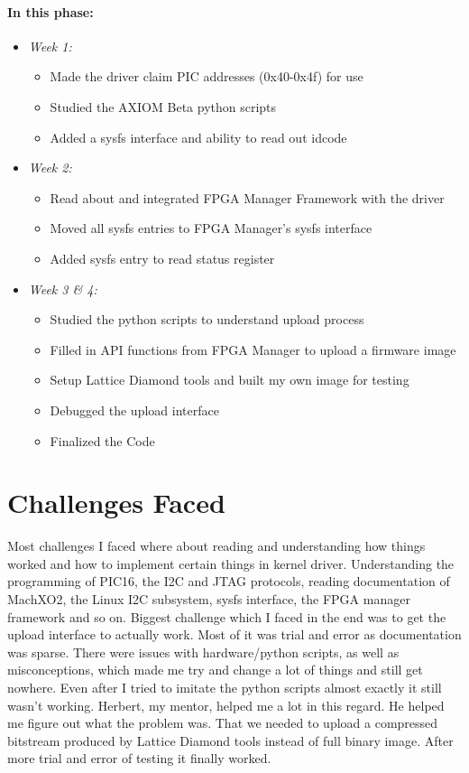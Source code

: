\documentclass{article}
\begin{document}
\paragraph{In this phase:}
\begin{itemize}
\item \emph{Week 1:} 
	\begin{itemize}
	\item Made the driver claim PIC addresses (0x40-0x4f) for use
	\item Studied the AXIOM Beta python scripts
	\item Added a sysfs interface and ability to read out idcode 
	\end{itemize}
\item \emph{Week 2:} 
	\begin{itemize}
	\item Read about and integrated FPGA Manager Framework with the driver 
	\item Moved all sysfs entries to FPGA Manager's sysfs interface 
	\item Added sysfs entry to read status register 
	\end{itemize}
\item \emph{Week 3 \& 4:} 
	\begin{itemize}
	\item Studied the python scripts to understand upload process
	\item Filled in API functions from FPGA Manager to upload a firmware image
	\item Setup Lattice Diamond tools and built my own image for testing
	\item Debugged the upload interface
	\item Finalized the Code
	\end{itemize}
\end{itemize}

\newpage

\section{Challenges Faced}
Most challenges I faced where about reading and understanding how things
worked and how to implement certain things in kernel driver. Understanding the
programming of PIC16, the I2C and JTAG protocols, reading documentation of
MachXO2, the Linux I2C subsystem, sysfs interface, the FPGA manager framework
and so on. Biggest challenge which I faced in the end was to get the upload
interface to actually work. Most of it was trial and error as documentation was
sparse. There were issues with hardware/python scripts, as well as
misconceptions, which made me try and change a lot of things and still get
nowhere. Even after I tried to imitate the python scripts almost exactly it
still wasn't working. Herbert, my mentor, helped me a lot in this regard. He
helped me figure out what the problem was. That we needed to upload a compressed
bitstream produced by Lattice Diamond tools instead of full binary image. After
more trial and error of testing it finally worked.
\end{document}
